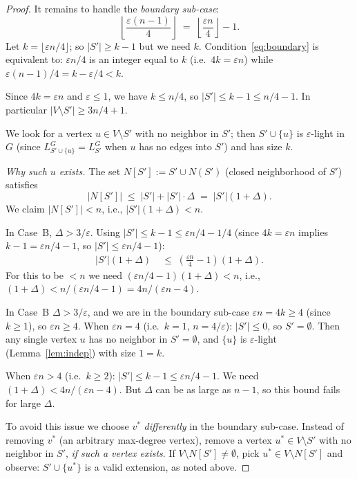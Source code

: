 \documentclass[12pt]{article}
\theoremstyle{definition}
\begin{document}
\begin{proof}
\smallskip
It remains to handle the \emph{boundary sub-case}:
\begin{equation}\label{eq:boundary}
   \left\lfloor\frac{\varepsilon(n-1)}{4}\right\rfloor
   \;=\; \left\lfloor\frac{\varepsilon n}{4}\right\rfloor - 1.
\end{equation}
Let $k=\lfloor\varepsilon n/4\rfloor$; so $|S'|\ge k-1$ but we need $k$.
Condition~\eqref{eq:boundary} is equivalent to: $\varepsilon n/4$ is an integer
equal to $k$ (i.e.\ $4k=\varepsilon n$) while $\varepsilon(n-1)/4=k-\varepsilon/4<k$.

Since $4k=\varepsilon n$ and $\varepsilon\le 1$, we have $k\le n/4$, so $|S'|\le k-1\le n/4-1$.
In particular $|V\setminus S'|\ge 3n/4+1$.

We look for a vertex $u\in V\setminus S'$ with no neighbor in $S'$; then
$S'\cup\{u\}$ is $\varepsilon$-light in $G$ (since $L_{S'\cup\{u\}}^G=L_{S'}^G$
when $u$ has no edges into $S'$) and has size $k$.

\medskip\noindent\textit{Why such $u$ exists.}
The set $N[S']:=S'\cup N(S')$ (closed neighborhood of $S'$) satisfies
\[
   |N[S']| \;\le\; |S'| + |S'|\cdot\Delta \;=\; |S'|(1+\Delta).
\]
We claim $|N[S']|<n$, i.e., $|S'|(1+\Delta)<n$.

In Case~B, $\Delta>3/\varepsilon$.  Using $|S'|\le k-1\le\varepsilon n/4 - 1/4$
(since $4k=\varepsilon n$ implies $k-1=\varepsilon n/4-1$, so $|S'|\le\varepsilon n/4 - 1$):
\begin{align*}
   |S'|(1+\Delta)
   &\;\le\; \left(\frac{\varepsilon n}{4}-1\right)\!\left(1+\Delta\right).
\end{align*}
For this to be $<n$ we need $({\varepsilon n}/{4}-1)(1+\Delta)<n$, i.e.,
$(1+\Delta) < n/({\varepsilon n}/{4}-1) = 4n/(\varepsilon n - 4)$.

In Case~B $\Delta>3/\varepsilon$, and we are in the boundary sub-case
$\varepsilon n=4k\ge 4$ (since $k\ge 1$), so $\varepsilon n\ge 4$.
When $\varepsilon n=4$ (i.e.\ $k=1$, $n=4/\varepsilon$): $|S'|\le 0$, so $S'=\emptyset$.
Then any single vertex $u$ has no neighbor in $S'=\emptyset$, and $\{u\}$
is $\varepsilon$-light (Lemma~\ref{lem:indep}) with size $1=k$.  \checkmark

When $\varepsilon n>4$ (i.e.\ $k\ge 2$): $|S'|\le k-1\le\varepsilon n/4-1$.
We need $(1+\Delta)<4n/(\varepsilon n-4)$.
But $\Delta$ can be as large as $n-1$, so this bound fails for large $\Delta$.

\medskip
To avoid this issue we choose $v^*$ \emph{differently} in the boundary sub-case.
Instead of removing $v^*$ (an arbitrary max-degree vertex), remove a vertex
$u^*\in V\setminus S'$ with no neighbor in $S'$, \emph{if such a vertex exists}.
If $V\setminus N[S']\ne\emptyset$, pick $u^*\in V\setminus N[S']$ and observe:
$S'\cup\{u^*\}$ is a valid extension, as noted above.


\end{proof}
\end{document}
